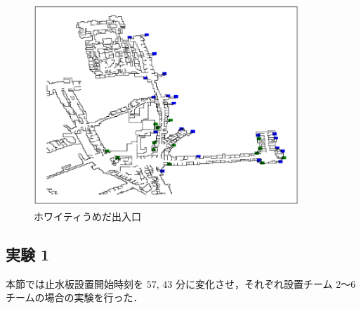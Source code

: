 \documentclass[a4paper,12pt,fleqn]{jarticle}
\begin{document}
\begin{figure}[H]
\begin{center}
  \includegraphics[width=10cm,bb=0.0 0.0 410.4 309.6, clip]{whity_map.pdf}
  \caption{ホワイティうめだ出入口}
  \label{whity}
  \end{center}
\end{figure}

    
    
\subsection{実験 1}
本節では止水板設置開始時刻を $57$, $43$ 分に変化させ，それぞれ設置チーム 2$～$6 チームの場合の実験を行った．
\end{document}
